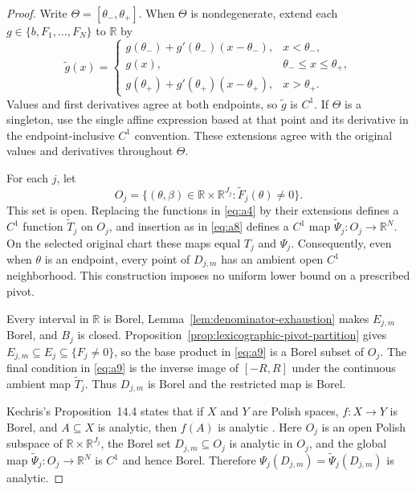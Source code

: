 \begin{proof}
Write $\Theta=[\theta_-,\theta_+]$.  When $\Theta$ is nondegenerate, extend
each $g\in\{b,F_1,\ldots,F_N\}$ to $\mathbb R$ by
\[
\widetilde g(x)=
\begin{cases}
g(\theta_-)+g'(\theta_-)(x-\theta_-),&x<\theta_-,\\
g(x),&\theta_-\leq x\leq\theta_+,\\
g(\theta_+)+g'(\theta_+)(x-\theta_+),&x>\theta_+.
\end{cases}
\tag{A11}\label{eq:a11}
\]
Values and first derivatives agree at both endpoints, so $\widetilde g$ is
$C^1$.  If $\Theta$ is a singleton, use the single affine expression based
at that point and its derivative in the endpoint-inclusive $C^1$
convention.  These extensions agree with the original values and
derivatives throughout $\Theta$.

For each $j$, let
\[
O_j=\{(\theta,\beta)\in
 \mathbb R\times\mathbb R^{J_j}:\widetilde F_j(\theta)\neq0\}.
\tag{A12}\label{eq:a12}
\]
This set is open.  Replacing the functions in \eqref{eq:a4} by their
extensions defines a $C^1$ function $\widetilde T_j$ on $O_j$, and insertion
as in \eqref{eq:a8} defines a $C^1$ map
$\widetilde\Psi_j:O_j\to\mathbb R^N$.  On the selected original chart these
maps equal $T_j$ and $\Psi_j$.  Consequently, even when $\theta$ is an
endpoint, every point of $D_{j,m}$ has an ambient open $C^1$ neighborhood.
This construction imposes no uniform lower bound on a prescribed pivot.

Every interval in $\mathbb R$ is Borel,
Lemma~\ref{lem:denominator-exhaustion} makes $E_{j,m}$ Borel, and $B_j$ is
closed.  Proposition~\ref{prop:lexicographic-pivot-partition} gives
$E_{j,m}\subseteq E_j\subseteq\{F_j\neq0\}$, so the base product in
\eqref{eq:a9} is a Borel subset of $O_j$.  The final condition in
\eqref{eq:a9} is the inverse image of $[-R,R]$ under the continuous ambient
map $\widetilde T_j$.  Thus $D_{j,m}$ is Borel and the restricted map is
Borel.

Kechris's Proposition~14.4 states that if $X$ and $Y$ are Polish spaces,
$f:X\to Y$ is Borel, and $A\subseteq X$ is analytic, then $f(A)$ is
analytic \citep[Section~14, Proposition~14.4, p.~86]{Kechris1995}.  Here
$O_j$ is an open Polish subspace of
$\mathbb R\times\mathbb R^{J_j}$, the Borel set $D_{j,m}\subseteq O_j$ is
analytic in $O_j$, and the global map
$\widetilde\Psi_j:O_j\to\mathbb R^N$ is $C^1$ and hence Borel.  Therefore
$\Psi_j(D_{j,m})=\widetilde\Psi_j(D_{j,m})$ is analytic.


\end{proof}
